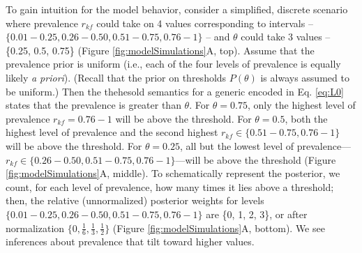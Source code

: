 \documentclass[floatsintext,doc]{apa6}
\newcommand{\denote}[1]{\mbox{ $[\![ #1 ]\!]$}}
\newcommand*\diff{\mathop{}\!\mathrm{d}}
\newcommand{\mht}[1]{{\textcolor{Blue}{[mht: #1]}}}
\begin{document}
To gain intuition for the model behavior, consider a simplified, discrete scenario where prevalence $r_{kf}$ could take on 4 values corresponding to intervals -- $\{0.01-0.25, 0.26 - 0.50, 0.51 - 0.75, 0.76 - 1\}$ -- and $\theta$ could take 3 values -- \{0.25, 0.5, 0.75\} (Figure \ref{fig:modelSimulations}A, top). Assume that the prevalence prior is uniform (i.e., each of the four levels of prevalence is equally likely \emph{a priori}). (Recall that the prior on thresholds $P(\theta)$ is always assumed to be uniform.)
Then the thehesold semantics for a generic encoded in Eq. \ref{eq:L0} states that the prevalence is greater than $\theta$.
For $\theta = 0.75$, only the highest level of prevalence $r_{kf} = 0.76 - 1$ will be above the threshold.  
For $\theta = 0.5$, both the highest level of prevalence and the second highest $r_{kf} \in \{0.51 - 0.75, 0.76 - 1\}$ will be above the threshold.  
For $\theta = 0.25$, all but the lowest level of prevalence---$r_{kf} \in \{0.26 - 0.50, 0.51 - 0.75, 0.76 - 1\}$---will be above the threshold (Figure \ref{fig:modelSimulations}A, middle).  
To schematically represent the posterior, we count, for each level of prevalence, how many times it lies above a threshold; then, the relative (unnormalized) posterior weights for levels $\{0.01-0.25, 0.26 - 0.50, 0.51 - 0.75, 0.76 - 1 \}$ are \{0, 1, 2, 3\}, or after normalization  $\{0, \frac{1}{6}, \frac{1}{3}, \frac{1}{2}\}$ (Figure \ref{fig:modelSimulations}A, bottom).
We see inferences about prevalence that tilt toward higher values.





%
%
\end{document}
